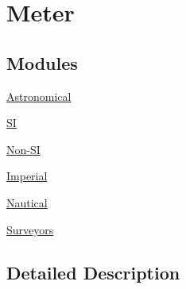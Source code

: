 \hypertarget{group___e_g_x_math-_conversions-_length_conversions-_meter}{}\section{Meter}
\label{group___e_g_x_math-_conversions-_length_conversions-_meter}
\subsection*{Modules}
\begin{DoxyCompactItemize}
\item 
\mbox{\hyperlink{group___e_g_x_math-_conversions-_length_conversions-_meter-_astronomical}{Astronomical}}
\item 
\mbox{\hyperlink{group___e_g_x_math-_conversions-_length_conversions-_meter-_s_i}{SI}}
\item 
\mbox{\hyperlink{group___e_g_x_math-_conversions-_length_conversions-_meter-_non-_s_i}{Non-\/\+SI}}
\item 
\mbox{\hyperlink{group___e_g_x_math-_conversions-_length_conversions-_meter-_imperial}{Imperial}}
\item 
\mbox{\hyperlink{group___e_g_x_math-_conversions-_length_conversions-_meter-_nautical}{Nautical}}
\item 
\mbox{\hyperlink{group___e_g_x_math-_conversions-_length_conversions-_meter-_surveyors}{Surveyors}}
\end{DoxyCompactItemize}


\subsection{Detailed Description}
